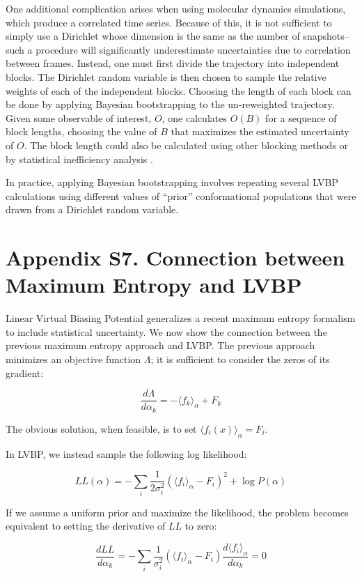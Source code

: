\documentclass[journal=jacsat,manuscript=article]{achemso}
\begin{document}
One additional complication arises when using molecular dynamics simulations, which produce a correlated time series.  Because of this, it is not sufficient to simply use a Dirichlet whose dimension is the same as the number of snapshots--such a procedure will significantly underestimate uncertainties due to correlation between frames.  Instead, one must first divide the trajectory into independent blocks.  The Dirichlet random variable is then chosen to sample the relative weights of each of the independent blocks.  Choosing the length of each block can be done by applying Bayesian bootstrapping to the un-reweighted trajectory.  Given some observable of interest, $O$, one calculates $O(B)$ for a sequence of block lengths, choosing the value of $B$ that maximizes the estimated uncertainty of $O$.  The block length could also be calculated using other blocking methods \cite{flyvbjerg1989error} or by statistical inefficiency analysis \cite{shirts2008}.  

In practice, applying Bayesian bootstrapping involves repeating several LVBP calculations using different values of ``prior'' conformational populations that were drawn from a Dirichlet random variable.

\section{Appendix S7.  Connection between Maximum Entropy and LVBP}


Linear Virtual Biasing Potential generalizes a recent maximum entropy formalism \cite{chodera2012} to include statistical uncertainty.  We now show the connection between the previous maximum entropy approach \cite{chodera2012} and LVBP.  The previous approach minimizes an objective function $\Lambda$; it is sufficient to consider the zeros of its gradient:

$$\frac{d\Lambda}{d\alpha_k} = -\langle f_k \rangle_\alpha + F_k$$

The obvious solution, when feasible, is to set $\langle f_i(x) \rangle_\alpha = F_i$.  

In LVBP, we instead sample the following log likelihood:

$$LL(\alpha) = -\sum_i \frac{1}{2\sigma_i^2}(\langle f_i\rangle _\alpha - F_i)^2 + \log P(\alpha)$$

If we assume a uniform prior and maximize the likelihood, the problem becomes equivalent to setting the derivative of $LL$ to zero:

$$ \frac{dLL}{d\alpha_k} =  -\sum_i \frac{1}{\sigma_i^2} (\langle f_i\rangle _\alpha - F_i) \frac{d\langle f_i\rangle _\alpha}{d\alpha_k} = 0$$
\end{document}
